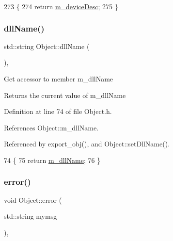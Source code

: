 \begin{DoxyCode}
273                           \{
274     \textcolor{keywordflow}{return} \hyperlink{classUsbFTMLInterface_a15063a6d03335ec8988e41eb61a1ab9f}{m\_deviceDesc};
275   \}
\end{DoxyCode}
\mbox{\label{classObject_a2e3947f2870094c332d7454117f3ec63}} 
\subsubsection{\texorpdfstring{dll\+Name()}{dllName()}}
{\footnotesize\ttfamily std\+::string Object\+::dll\+Name (\begin{DoxyParamCaption}{ }\end{DoxyParamCaption})\hspace{0.3cm}{\ttfamily [inline]}, {\ttfamily [inherited]}}

Get accessor to member m\+\_\+dll\+Name \begin{DoxyReturn}{Returns}
the current value of m\+\_\+dll\+Name 
\end{DoxyReturn}


Definition at line 74 of file Object.\+h.



References Object\+::m\+\_\+dll\+Name.



Referenced by export\+\_\+obj(), and Object\+::set\+Dll\+Name().


\begin{DoxyCode}
74                        \{
75     \textcolor{keywordflow}{return} \hyperlink{classObject_a01afbeacebb8db6831559972ec362eb3}{m\_dllName};
76   \}  
\end{DoxyCode}
\mbox{\label{classObject_a204a95f57818c0f811933917a30eff45}} 
\subsubsection{\texorpdfstring{error()}{error()}\hspace{0.1cm}{\footnotesize\ttfamily [1/2]}}
{\footnotesize\ttfamily void Object\+::error (\begin{DoxyParamCaption}\item[{std\+::string}]{mymsg }\end{DoxyParamCaption})\hspace{0.3cm}{\ttfamily [inline]}, {\ttfamily [inherited]}}



